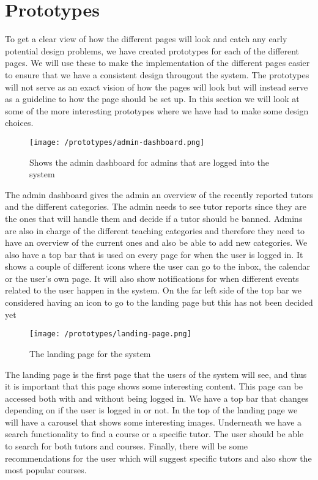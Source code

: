 \section{Prototypes}
To get a clear view of how the different pages will look and catch any early potential design problems, we have created prototypes for each of the different pages. 
We will use these to make the implementation of the different pages easier to ensure that we have a consistent design througout the system. 
The prototypes will not serve as an exact vision of how the pages will look but will instead serve as a guideline to how the page should be set up.
In this section we will look at some of the more interesting prototypes where we have had to make some design choices.
\begin{figure}[H]
    \texttt{[image: /prototypes/admin-dashboard.png]}
     \caption{Shows the admin dashboard for admins that are logged into the system}
     \label{fig:admin-dashboard}
 \end{figure}
The admin dashboard gives the admin an overview of the recently reported tutors and the different categories. 
The admin needs to see tutor reports since they are the ones that will handle them and decide if a tutor should be banned. 
Admins are also in charge of the different teaching categories and therefore they need to have an overview of the current ones and also be able to add new categories.
We also have a top bar that is used on every page for when the user is logged in. It shows a couple of different icons where the user can go to the inbox, the calendar or the user's own page. 
It will also show notifications for when different events related to the user happen in the system. 
On the far left side of the top bar we considered having an icon to go to the landing page but this has not been decided yet
\begin{figure}[H]
   \texttt{[image: /prototypes/landing-page.png]}
    \caption{The landing page for the system}
    \label{fig:landing-page}
\end{figure}
The landing page is the first page that the users of the system will see, and thus it is important that this page shows some interesting content. 
This page can be accessed both with and without being logged in. 
We have a top bar that changes depending on if the user is logged in or not. 
In the top of the landing page we will have a carousel that shows some interesting images.
Underneath we have a search functionality to find a course or a specific tutor. 
The user should be able to search for both tutors and courses. 
Finally, there will be some recommendations for the user which will suggest specific tutors and also show the most popular courses. 

